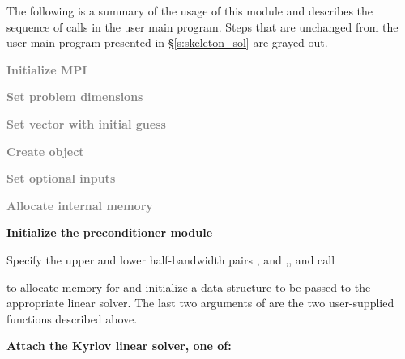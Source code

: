 The following is a summary of the usage of this module and describes the sequence
of calls in the user main program. Steps that are unchanged from the user main
program presented in \S\ref{s:skeleton_sol} are grayed out.
\begin{Steps}
\item 
  \textcolor{gray}{\bf Initialize MPI}

\item
  \textcolor{gray}{\bf Set problem dimensions}

\item
  \textcolor{gray}{\bf Set vector with initial guess}
 
\item
  \textcolor{gray}{\bf Create {\kinsol} object}

\item
  \textcolor{gray}{\bf Set optional inputs}

\item
  \textcolor{gray}{\bf Allocate internal memory}

\item \label{i:bbdpre_init}
  {\bf Initialize the {\kinbbdpre} preconditioner module}

  Specify the upper and lower half-bandwidth pairs , and
  ,, and call


  to allocate memory for and initialize a data structure  to be 
  passed to the appropriate {\kinspils} linear solver. The last two arguments of
   are the two user-supplied functions described above.

\item \label{i:bbdpre_attach}
  {\bf Attach the Kyrlov linear solver, one of:}





\end{Steps}
